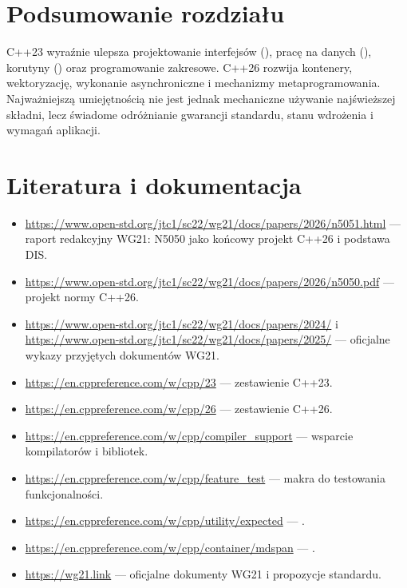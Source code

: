 
\section*{Podsumowanie rozdziału}

C++23 wyraźnie ulepsza projektowanie interfejsów (),
pracę na danych (), korutyny () oraz
programowanie zakresowe. C++26 rozwija kontenery, wektoryzację,
wykonanie asynchroniczne i mechanizmy metaprogramowania.
Najważniejszą umiejętnością nie jest jednak mechaniczne używanie
najświeższej składni, lecz świadome odróżnianie gwarancji
standardu, stanu wdrożenia i wymagań aplikacji.

\section*{Literatura i dokumentacja}
\begingroup\sloppy
\begin{itemize}
\item \url{https://www.open-std.org/jtc1/sc22/wg21/docs/papers/2026/n5051.html} --- raport redakcyjny WG21: N5050 jako końcowy projekt C++26 i podstawa DIS.
\item \url{https://www.open-std.org/jtc1/sc22/wg21/docs/papers/2026/n5050.pdf} --- projekt normy C++26.
\item \url{https://www.open-std.org/jtc1/sc22/wg21/docs/papers/2024/} i \url{https://www.open-std.org/jtc1/sc22/wg21/docs/papers/2025/} --- oficjalne wykazy przyjętych dokumentów WG21.
\item \url{https://en.cppreference.com/w/cpp/23} --- zestawienie C++23.
\item \url{https://en.cppreference.com/w/cpp/26} --- zestawienie C++26.
\item \url{https://en.cppreference.com/w/cpp/compiler_support} --- wsparcie kompilatorów i bibliotek.
\item \url{https://en.cppreference.com/w/cpp/feature_test} --- makra do testowania funkcjonalności.
\item \url{https://en.cppreference.com/w/cpp/utility/expected} --- .
\item \url{https://en.cppreference.com/w/cpp/container/mdspan} --- .
\item \url{https://wg21.link} --- oficjalne dokumenty WG21 i propozycje standardu.
\end{itemize}
\endgroup
